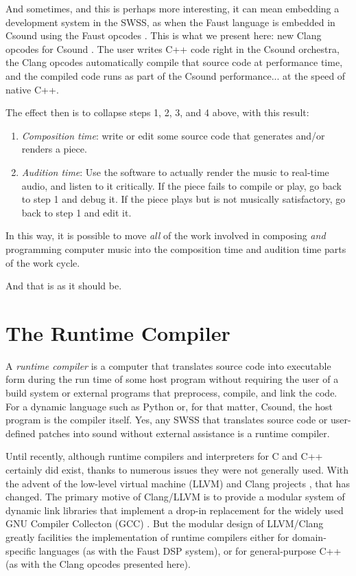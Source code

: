 \documentclass[letterpaper, 12pt]{article}
\begin{document}
And sometimes, and this is perhaps more interesting, it can mean embedding a development system in the SWSS, as when the Faust language \citep{faust, orlarey2009faust} is embedded in Csound using the Faust opcodes \citep{Lazzarini2014, faustcompile, faustdsp}. This is what we present here: new Clang opcodes for Csound \citep{clangpcodes}. The user writes C++ code right in the Csound orchestra, the Clang opcodes automatically compile that source code at performance time, and the compiled code runs as part of the Csound performance... at the speed of native C++.

The effect then is to collapse steps 1, 2, 3, and 4 above, with this result:

\begin{enumerate}
\item \textit{Composition time}: write or edit some source code that generates and/or renders a piece.
\item \textit{Audition time}: Use the software to actually render the music to real-time audio, and listen to it critically. If the piece fails to compile or play, go back to step 1 and debug it. If the piece plays but is not musically satisfactory, go back to step 1 and edit it.
\end{enumerate}

\indent In this way, it is possible to move \textit{all} of the work involved in composing \textit{and} programming computer music into the composition time and audition time parts of the work cycle.

And that is as it should be.

\section{The Runtime Compiler}

A \textit{runtime compiler} is a computer that translates source code into executable form during the run time of some host program without requiring the user of a build system or external programs that preprocess, compile, and link the code. For a dynamic language such as Python or, for that matter, Csound, the host program is the compiler itself. Yes, any SWSS that translates source code or user-defined patches into sound without external assistance is a runtime compiler.

Until recently, although runtime compilers and interpreters for C and C++ certainly did exist, thanks to numerous issues they were not generally used. With the advent of the low-level virtual machine (LLVM) and Clang projects \citep{llvm}, that has changed. The primary motive of Clang/LLVM is to provide a modular system of dynamic link libraries that implement a drop-in replacement for the widely used GNU Compiler Collecton (GCC) \citep{gcc}. But the modular design of LLVM/Clang greatly facilities the implementation of runtime compilers either for domain-specific languages (as with the Faust DSP system), or for general-purpose C++ (as with the Clang opcodes presented here).
\end{document}
